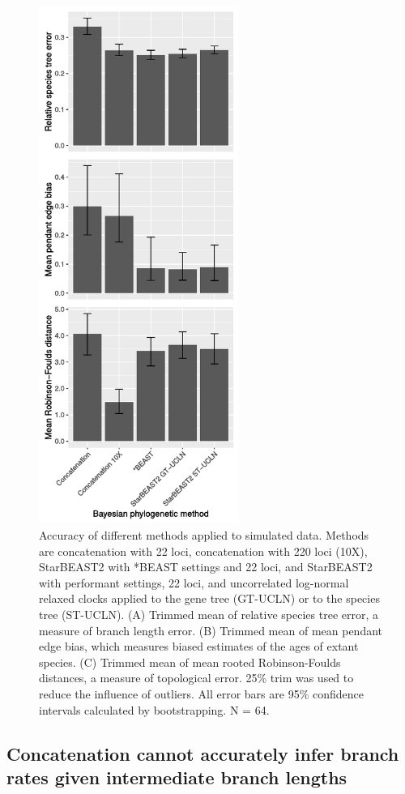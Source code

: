 \documentclass[12pt]{article}
\begin{document}
\begin{figure}[htb!]
\centering
\includegraphics[width=6.5cm]{tree_error.pdf}
\caption
{Accuracy of different methods applied to simulated data. Methods are concatenation with 22 loci, concatenation with 220 loci
(10X), StarBEAST2 with *BEAST settings and 22 loci, and StarBEAST2 with
performant settings, 22 loci, and uncorrelated log-normal relaxed clocks applied
to the gene tree (GT-UCLN) or to the species tree (ST-UCLN). (A) Trimmed mean of
relative species tree error, a measure of branch length error. (B) Trimmed
mean of mean pendant edge bias, which measures biased estimates of the ages of
extant species. (C) Trimmed mean of mean rooted Robinson-Foulds distances, a
measure of topological error. 25\% trim was used to reduce the
influence of outliers. All error bars are 95\% confidence intervals calculated
by bootstrapping. N = 64.}
\label{fig:speciesTreeError}
\end{figure}

\subsection*{Concatenation cannot accurately infer branch rates given intermediate branch lengths}
\end{document}
